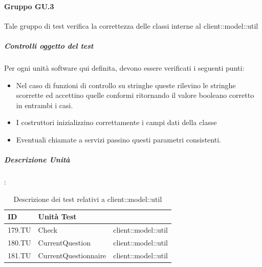 \documentclass[12pt,a4paper]{article}
\begin{document}
\paragraph{Gruppo GU.3}
Tale gruppo di test verifica la correttezza delle classi interne al  client::model::util
\subparagraph{Controlli oggetto del test}
Per ogni unità software qui definita, devono essere verificati i seguenti punti:
\begin{itemize}
	\item Nel caso di funzioni di controllo su stringhe queste rilevino le stringhe scorrette ed accettino quelle conformi ritornando il valore booleano corretto in entrambi i casi.
	\item I costruttori inizializzino correttamente i campi dati della classe
	\item Eventuali chiamate a servizi passino  questi parametri consistenti.
\end{itemize}
\subparagraph{Descrizione Unità}:
\begin{table}[H]
	\begin{center}
		\begin{tabular}{p{} p{} p{}}
			\toprule
			\textbf{ID}   & \textbf{Unità Test}	& \textbf{\mgls{package}} \\ \midrule
			\midrule
			179.TU & Check & client::model::util\\ \midrule
			180.TU & CurrentQuestion & client::model::util\\ \midrule
			181.TU & CurrentQuestionnaire & client::model::util\\ \midrule
			
			\bottomrule
		\end{tabular}
	\end{center}
	\caption{Descrizione dei test relativi a client::model::util}
\end{table}
\end{document}
